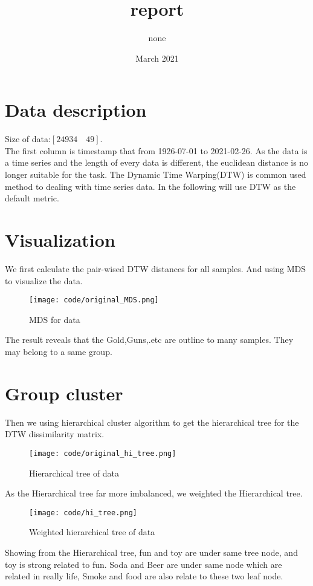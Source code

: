 \documentclass{article}
\title{report}
\author{none }
\date{March 2021}
\begin{document}
\maketitle

\section{Data description}

Size of data:$[   24934      \quad    49]$.
\\The first column is timestamp that from 1926-07-01 to 2021-02-26.
As the data is a time series and the length of every data is different, the euclidean distance is no longer suitable for the task. The Dynamic Time Warping(DTW) is common used method to dealing with time series data. In the following  will use DTW as the default metric.
\section{Visualization}
We first calculate the pair-wised DTW distances for all samples. And using MDS to visualize the data.

\begin{figure}[!h]
\centering
\texttt{[image: code/original\_MDS.png]}
\caption{MDS for data}
\label{fig:or_MDS}
\end{figure}
The result reveals that the Gold,Guns,.etc are outline to many samples. They may belong to a same group.


\section{Group cluster}
Then we using hierarchical cluster algorithm to get the hierarchical tree for the DTW dissimilarity matrix.   
\begin{figure}[!h]
\centering
\texttt{[image: code/original\_hi\_tree.png]}
\caption{Hierarchical tree of data}
\label{fig:or_hitree}
\end{figure}
As the Hierarchical tree far more imbalanced, we weighted the Hierarchical tree.
\begin{figure}[!h]
\centering
\texttt{[image: code/hi\_tree.png]}
\caption{Weighted hierarchical tree of data}
\label{fig:weighted_hitree}
\end{figure}
Showing from the Hierarchical tree, fun and toy are under same tree node, and toy is strong related to fun.
Soda and Beer are under same node which are related in really life, Smoke and food are also relate to these two leaf node. 
\end{document}
